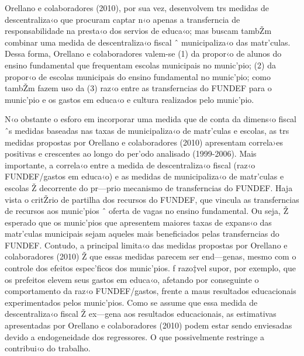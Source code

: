 \documentclass[a4paper, 12pt]{article}
\begin{document}
Orellano e colaboradores (2010), por sua vez, desenvolvem trs medidas de descentraliza‹o que procuram captar n‹o apenas a transferncia de responsabilidade na presta‹o dos servios de educa‹o; mas buscam tambŽm combinar uma medida de descentraliza‹o fiscal ˆ municipaliza‹o das matr’culas.  Dessa forma, Orellano e colaboradores valem-se (1) da propor‹o de alunos do ensino fundamental que frequentam escolas municipais no munic’pio; (2) da propor‹o de escolas municipais do ensino fundamental no munic’pio;  como tambŽm fazem uso da (3) raz‹o entre as transferncias do FUNDEF para o munic’pio e os gastos em educa‹o e cultura realizados pelo munic’pio. 

N‹o obstante o esforo em incorporar uma medida que de conta da dimens‹o fiscal ˆs medidas baseadas nas taxas de municipaliza‹o de matr’culas e escolas, as trs medidas propostas por Orellano e colaboradores (2010) apresentam correla›es positivas e crescentes ao longo do per’odo analisado (1999-2006). Mais importante, a correla‹o entre a medida de descentraliza‹o fiscal (raz‹o FUNDEF/gastos em educa‹o) e as medidas de municipaliza‹o de matr’culas e escolas Ž decorrente do pr—prio mecanismo de transferncias do FUNDEF. Haja vista o critŽrio de partilha dos recursos do FUNDEF, que vincula as transferncias de recursos aos munic’pios ˆ oferta de vagas no ensino fundamental. Ou seja, Ž esperado que os munic’pios que apresentem maiores taxas de expans‹o das matr’culas municipais sejam aqueles mais beneficiados pelas transferncias do FUNDEF. Contudo, a principal limita‹o das medidas propostas por Orellano e colaboradores (2010) Ž que essas medidas parecem ser end—genas, mesmo com o controle dos efeitos espec’ficos dos munic’pios. ƒ razo‡vel supor, por exemplo, que os prefeitos elevem seus gastos em educa‹o, afetando por conseguinte o comportamento da raz‹o FUNDEF/gastos, frente a maus resultados educacionais experimentados pelos munic’pios. Como se assume que essa medida de descentraliza‹o fiscal Ž ex—gena aos resultados educacionais, as estimativas apresentadas por Orellano e colaboradores (2010) podem estar sendo enviesadas devido a endogeneidade dos regressores. O que possivelmente restringe a contribui‹o do trabalho. 
\end{document}

